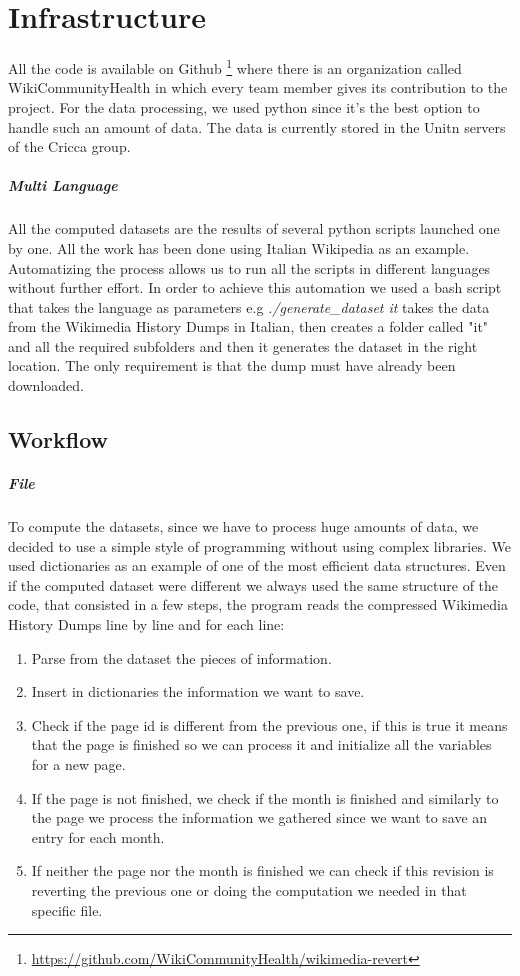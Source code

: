 \chapter{Infrastructure}

All the code is available on Github
\footnote{\url{https://github.com/WikiCommunityHealth/wikimedia-revert}} where there is an
organization called WikiCommunityHealth in which every team member gives its contribution to the
project. For the data processing, we used python since it's the best option to handle such an amount of
data. The data is currently stored in the Unitn servers of the Cricca group.
\paragraph*{Multi Language}
All the computed datasets are the results of several python scripts launched one by one. All the
work has been done using Italian Wikipedia as an example. Automatizing the process allows us to run
all the scripts in different languages without further effort. In order to achieve this automation we
used a bash script that takes the language as parameters e.g \textit{./generate\_dataset it} takes
the data from the Wikimedia History Dumps in Italian, then creates a folder called "it" and all the required subfolders
and then it generates the dataset in the right location. The only requirement is that the dump
must have already been downloaded. 


\section{Workflow}

\paragraph{File}
To compute the datasets, since we have to process huge amounts of data, we decided to use a
simple style of programming without using complex libraries. We used dictionaries as an example of
one of the most efficient data structures. Even if the computed dataset were different we always used
the same structure of the code, that consisted in a few steps, the program reads the compressed
Wikimedia History Dumps line by line and for each line:
\begin{enumerate}
    \item Parse from the dataset the pieces of information.
    \item Insert in dictionaries the information we want to save.
    \item Check if the page id is different from the previous one, if this is true it means that the
    page is finished so we can process it and initialize all the variables for a new page.
    \item If the page is not finished, we check if the month is finished and similarly to the page
    we process the information we gathered since we want to save an entry for each month.
    \item If neither the page nor the month is finished we can check if this revision is reverting the
    previous one or doing the computation we needed in that specific file.
\end{enumerate}

